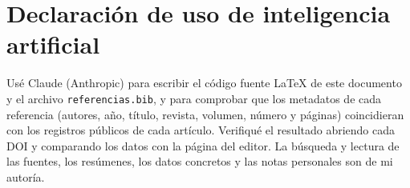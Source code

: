 \documentclass[11pt,a4paper]{article}
\begin{document}
\section*{Declaración de uso de inteligencia artificial}

Usé Claude (Anthropic) para escribir el código fuente LaTeX de este documento y el archivo
\texttt{referencias.bib}, y para comprobar que los metadatos de cada referencia (autores,
año, título, revista, volumen, número y páginas) coincidieran con los registros públicos de
cada artículo. Verifiqué el resultado abriendo cada DOI y comparando los datos con la
página del editor. La búsqueda y lectura de las fuentes, los resúmenes, los datos concretos
y las notas personales son de mi autoría.

\clearpage
\printbibliography[title={Referencias}]
\end{document}
